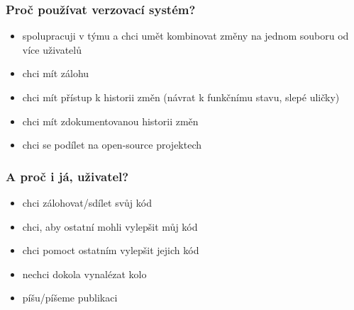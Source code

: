 \documentclass[10pt, xcolor=dvipsnames]{beamer} %
\newcommand{\figpath}{../graphics/}
\begin{document}
%   
%         
%     

\begin{frame}
  \frametitle{Proč používat verzovací systém?}
  
  \begin{itemize}
    \setlength\itemsep{10pt}
    \item spolupracuji v týmu a chci umět kombinovat změny na jednom souboru od více uživatelů
    \item chci mít zálohu
    \item chci mít přístup k historii změn (návrat k funkčnímu stavu, slepé uličky)
    \item chci mít zdokumentovanou historii změn
    \item chci se podílet na open-source projektech
  \end{itemize}
  
  \vspace{0.5cm}
  
\end{frame}


\begin{frame}
  \frametitle{A proč i já, uživatel?}
  
  \vspace{10pt}
  \begin{itemize}
    \setlength\itemsep{10pt}
    \item chci zálohovat/sdílet svůj kód
    \item chci, aby ostatní mohli vylepšit můj kód
    \item chci pomoct ostatním vylepšit jejich kód
    \item nechci dokola vynalézat kolo
    \item píšu/píšeme publikaci
  \end{itemize}
\end{frame}
\end{document}
